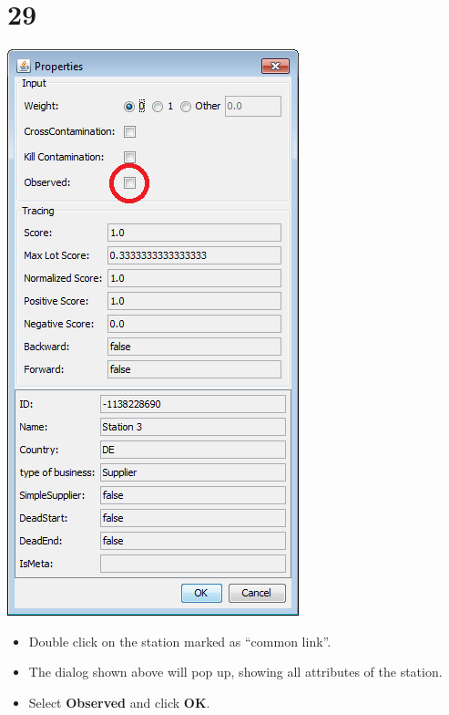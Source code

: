 \documentclass[10pt]{beamer}
\begin{document}
\section{29}
\begin{frame}
	\begin{center}
  		\includegraphics[height=0.6\textheight]{29.png}
	\end{center}
	\begin{itemize}
		\item Double click on the station marked as ``common link''.
		\item The dialog shown above will pop up, showing all attributes of the station.
		\item Select \textbf{Observed} and click \textbf{OK}.
	\end{itemize}
\end{frame}
\end{document}
